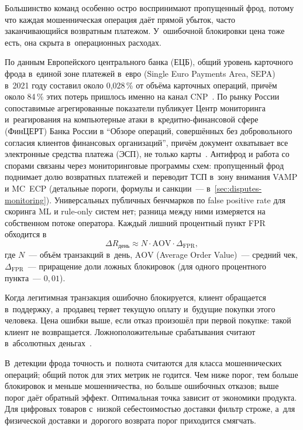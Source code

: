 Большинство команд особенно остро воспринимают пропущенный фрод,
потому что каждая мошенническая операция даёт
прямой убыток, часто заканчивающийся возвратным платежом. У~ошибочной
блокировки цена тоже есть, она скрыта в~операционных расходах.

По данным Европейского центрального банка (ЕЦБ), общий уровень карточного
фрода в~единой зоне платежей в~евро (Single Euro Payments Area, SEPA)
в~2021 году составил около 0,028\,\% от объёма
карточных операций, причём около 84\,\% этих потерь пришлось
именно на канал CNP~\cite{ecb-card-fraud-2021}. По
рынку России сопоставимые агрегированные показатели
публикует Центр мониторинга и~реагирования на компьютерные
атаки в~кредитно-финансовой сфере (ФинЦЕРТ) Банка России
в \enquote{Обзоре операций,
совершённых без добровольного согласия клиентов финансовых
организаций}, причём документ охватывает все электронные средства
платежа (ЭСП), не только
карты~\cite{cbr-fincert-fraud-overview}.
Антифрод и работа со спорами связаны через мониторинговые
программы схем: пропущенный фрод поднимает долю возвратных
платежей и~переводит ТСП в~зону внимания VAMP и MC~ECP
(детальные пороги, формулы и санкции~--- в~\ref{sec:disputes-monitoring}).
Универсальных публичных бенчмарков по false positive rate
для скоринга ML и rule-only систем нет; разница между ними
измеряется на собственном потоке оператора. Каждый лишний
процентный пункт FPR обходится в
\[
  \Delta R_{\text{день}} \approx N \cdot \mathrm{AOV} \cdot \Delta_{\mathrm{FPR}},
\]
где $N$~--- объём транзакций в~день, $\mathrm{AOV}$ (Average Order
Value)~--- средний чек, $\Delta_{\mathrm{FPR}}$~--- приращение
доли ложных блокировок (для одного процентного пункта~--- $0{,}01$).

Когда легитимная транзакция ошибочно блокируется, клиент обращается
в~поддержку, а~продавец теряет текущую оплату и~будущие покупки этого
человека. Цена ошибки выше, если отказ произошёл при первой
покупке: такой клиент не возвращается. Ложноположительные
срабатывания считают в~абсолютных
деньгах~\cite{visa-auth-management-2020}.

В~детекции фрода точность и~полнота считаются для класса
мошеннических операций; общий поток для этих метрик не годится.
Чем ниже порог, тем больше
блокировок и меньше мошенничества, но больше ошибочных отказов;
выше порог даёт обратный эффект. Оптимальная точка зависит от экономики
продукта. Для цифровых товаров с~низкой себестоимостью доставки фильтр
строже, а~для физической доставки и~дорогого возврата порог приходится
смягчать.

